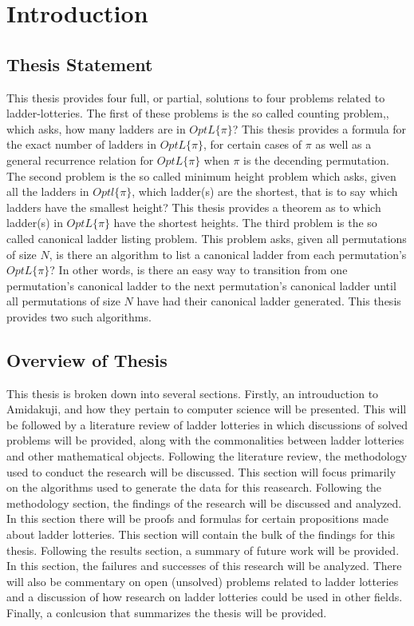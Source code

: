 



\chapter{Introduction}
\label{chapter:intro}



\section{Thesis Statement}
    This thesis provides four full, or partial, solutions to four problems related 
    to ladder-lotteries. The first of these problems is the so called counting problem,, 
    which asks, how many ladders are in $OptL\{\pi\}$? This thesis provides 
    a formula for the exact number of ladders in $OptL\{\pi\}$, for certain 
    cases of $\pi$ as well as a general recurrence relation for $OptL\{\pi\}$
    when $\pi$ is the decending permutation. The second problem is the so called minimum height 
    problem which asks, given all the ladders in $Optl\{\pi\}$, which ladder(s) are 
    the shortest, that is to say which ladders have the smallest height? This thesis 
    provides a theorem as to which ladder(s) in $OptL\{\pi\}$ have the shortest heights.
    The third problem is the so called canonical ladder listing problem. 
    This problem asks, given all permutations of size $N$, is there an algorithm 
    to list a canonical ladder from each permutation's $OptL\{\pi\}$? In other words, 
    is there an easy way to transition from one permutation's canonical ladder to the next 
    permutation's canonical ladder until all permutations of size $N$ have had their canonical 
    ladder generated. This thesis provides two such algorithms.
\section{Overview of Thesis}  

This thesis is broken down into several sections. Firstly, an introuduction to Amidakuji, 
and how they pertain to computer science will be presented. This will be followed by a literature 
review of ladder lotteries in which discussions of solved problems will be 
provided, along with the commonalities between ladder lotteries and 
other mathematical objects. Following the literature review, the methodology
used to conduct the research will be discussed. This section will focus 
primarily on the algorithms used to generate the data for this reasearch. 
Following the methodology section, the findings of the research will be discussed and analyzed. 
In this section there will be proofs and formulas for certain propositions made about ladder 
lotteries. This section will contain the bulk of the findings for this thesis.
Following the results section, a summary of future work will be provided. In this section,
the failures and successes of this research will be analyzed. There will also be commentary on 
open (unsolved) problems related to ladder lotteries and a 
discussion of how research on ladder lotteries could be used in other fields.
Finally, a conlcusion that summarizes the thesis will be provided.


